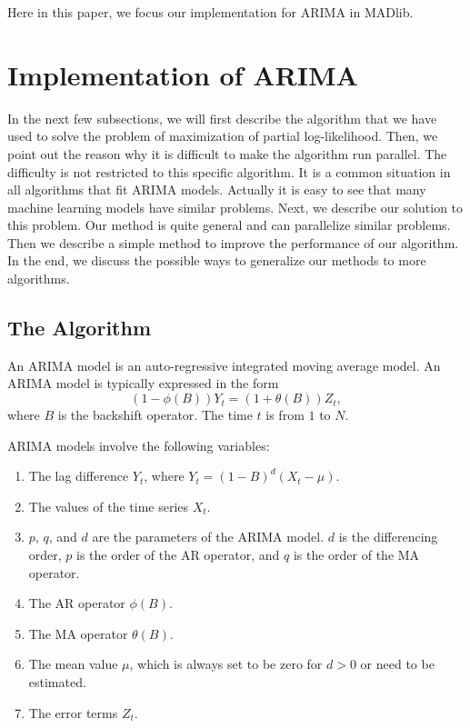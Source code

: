 \documentclass[english,12pt]{article}
\begin{document}
Here in this paper, we focus our implementation for ARIMA in MADlib.

\section{Implementation of ARIMA}


In the next few subsections, we will first describe the algorithm that we have
used to solve the problem of maximization of partial log-likelihood. Then, we
point out the reason why it is difficult to make the algorithm run parallel.
The difficulty is not restricted to this specific algorithm. It is a
common situation in all algorithms that fit ARIMA models. Actually it is easy
to see that many machine learning models have similar problems. Next, we
describe our solution to this problem. Our method is quite general and can
parallelize similar problems. Then we describe a simple method to improve the
performance of our algorithm. In the end, we discuss the possible ways to
generalize our methods to more algorithms.

\subsection{The Algorithm}


An ARIMA model is an auto-regressive integrated moving average model. An ARIMA
model is typically expressed in the form
\begin{equation}
(1 - \phi(B)) Y_t  = (1 + \theta(B)) Z_t,
\end{equation}
where $B$ is the backshift operator. The time $t$ is from $1$ to $N$.

ARIMA models involve the following variables:
\begin{enumerate}
   \item The lag difference $Y_{t}$, where  $Y_{t} = {(1-B)}^{d}(X_{t} - \mu)$.
    \item The values of the time series $X_t$.
    \item $p$, $q$, and $d$ are the parameters of the ARIMA model.
      $d$ is the differencing order, $p$ is the order of the AR
      operator, and $q$ is the order of the MA operator.
    \item The AR operator $\phi(B)$.
    \item The MA operator $\theta(B)$.
    \item The mean value $\mu$, which is always set to be zero for
      $d>0$ or need to be estimated.
    \item The error terms $Z_t$.
\end{enumerate}
\end{document}
